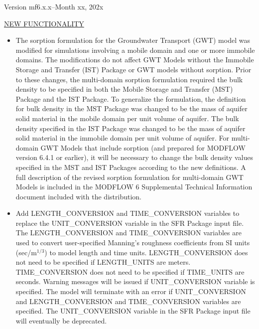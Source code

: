 	
	\item Version mf6.x.x--Month xx, 202x
	
	\underline{NEW FUNCTIONALITY}
	\begin{itemize}
		\item The sorption formulation for the Groundwater Transport (GWT) model was modified for simulations involving a mobile domain and one or more immobile domains.  The modifications do not affect GWT Models without the Immobile Storage and Transfer (IST) Package or GWT models without sorption.  Prior to these changes, the multi-domain sorption formulation required the bulk density to be specified in both the Mobile Storage and Transfer (MST) Package and the IST Package.  To generalize the formulation, the definition for bulk density in the MST Package was changed to be the mass of aquifer solid material in the mobile domain per unit volume of aquifer.  The bulk density specified in the IST Package was changed to be the mass of aquifer solid material in the immobile domain per unit volume of aquifer.  For multi-domain GWT Models that include sorption (and prepared for MODFLOW version 6.4.1 or earlier), it will be necessary to change the bulk density values specified in the MST and IST Packages according to the new definitions.  A full description of the revised sorption formulation for multi-domain GWT Models is included in the MODFLOW 6 Supplemental Technical Information document included with the distribution.
		\item Add LENGTH\_CONVERSION and TIME\_CONVERSION variables to replace the UNIT\_CONVERSION variable in the SFR Package input file. The LENGTH\_CONVERSION and TIME\_CONVERSION variables are used to convert user-specified Manning's roughness coefficients from SI units (sec/m$^{1/3}$) to model length and time units. LENGTH\_CONVERSION does not need to be specified if LENGTH\_UNITS are meters. TIME\_CONVERSION does not need to be specified if TIME\_UNITS are seconds. Warning messages will be issued if UNIT\_CONVERSION variable is specified. The model will terminate with an error if UNIT\_CONVERSION and LENGTH\_CONVERSION and TIME\_CONVERSION variables are specified. The UNIT\_CONVERSION variable in the SFR Package input file will eventually be deprecated. 
	\end{itemize}

